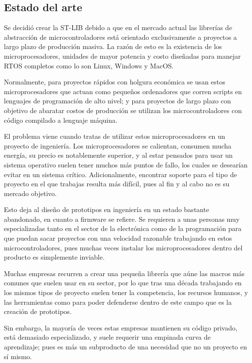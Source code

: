 \documentclass{report}
\begin{document}
\subsection{Estado del arte}
Se decidió crear la ST-LIB debido a que en el mercado actual las librerías de abstracción de microcontroladores está orientado exclusivamente a proyectos a largo plazo de producción masiva. La razón de esto es la existencia de los microprocesadores, unidades de mayor potencia y costo diseñadas para manejar RTOS completos como lo son Linux, Windows y MacOS. \par
Normalmente, para proyectos rápidos con holgura económica se usan estos microprocesadores que actuan como pequeños ordenadores que corren scripts en lenguajes de programación de alto nivel; y para proyectos de largo plazo con objetivo de abaratar costos de producción se utilizan los microcontroladores con código compilado a lenguaje máquina. 
\par \vspace{0.3cm}  
El problema viene cuando tratas de utilizar estos microprocesadores en un proyecto de ingeniería. Los microprocesadores se calientan, consumen mucha energía, su precio es notablemente superior, y al estar pensados para usar un sistema operativo suelen tener muchos más puntos de fallo, los cuales se desearían evitar en un sistema crítico. Adicionalmente, encontrar soporte para el tipo de proyecto en el que trabajas resulta más difícil, pues al fin y al cabo no es su mercado objetivo.
\par \vspace{0.3cm}
Esto deja al diseño de prototipos en ingeniería en un estado bastante abandonado, en cuanto a firmware se refiere. Se requieren a unas personas muy especializadas tanto en el sector de la electrónica como de la programación para que puedan sacar proyectos con una velocidad razonable trabajando en estos microcontroladores, pues muchas veces instalar los microprocesadores dentro del producto es simplemente inviable. \par
Muchas empresas recurren a crear una pequeña librería que aúne las macros más comunes que suelen usar en su sector, por lo que tras una década trabajando en los mismos tipos de proyecto suelen tener la competencia, los recursos humanos, y las herramientas como para poder defenderse dentro de este campo que es la creación de prototipos. \par
Sin embargo, la mayoría de veces estas empresas mantienen su código privado, está demasiado especializado, y suele requerir una empinada curva de aprendizaje; pues es más un subproducto de una necesidad que no un proyecto en sí mismo. \par \vspace{0.3cm}
\end{document}
